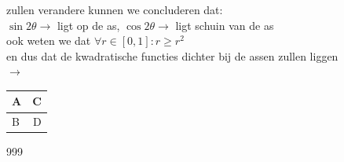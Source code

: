 \documentclass[a4paper]{article}
\begin{document}
zullen verandere kunnen we concluderen dat: \\

$ \sin2\theta \rightarrow$ ligt op de as, $ \cos2\theta \rightarrow$ ligt schuin van de as\\

ook weten we dat $\forall r \in [0, 1] : r \geq r^2 $\\

en dus dat de kwadratische functies dichter bij de assen zullen liggen\\

$\rightarrow$ \begin{tabular}{ l | r }	
  A &C \\ \hline
  B &D \\
\end{tabular}

\begin{thebibliography}{999}
\end{thebibliography}
\end{document}

